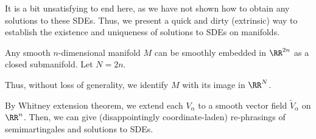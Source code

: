 \documentclass{scrartcl}
\begin{document}
It is a bit unsatisfying to end here, as we have not shown how to obtain any solutions to these SDEs. Thus, we present a quick and dirty (extrinsic) way to establish the existence and uniqueness of solutions to SDEs on manifolds.

\begin{thm}
    Any smooth $n$-dimensional manifold $M$ can be smoothly embedded in $\RR^{2n}$ as a closed submanifold. Let $N = 2n$.
\end{thm}

Thus, without loss of generality, we identify $M$ with its image in $\RR^{N}$.


By Whitney extension theorem, we extend each $V_\alpha$ to a smooth vector field $\tilde{V}_\alpha$ on $\RR^n$. Then, we can give (disappointingly coordinate-laden) re-phrasings of semimartingales and solutions to SDEs.
\end{document}
